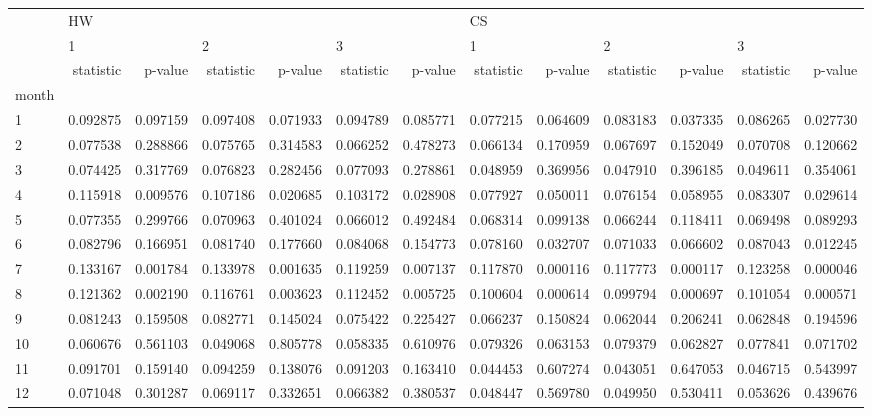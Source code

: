 \begin{tabular}{lrrrrrrrrrrrr}
\toprule
{} & \multicolumn{6}{l}{HW} & \multicolumn{6}{l}{CS} \\
{} & \multicolumn{2}{l}{1} & \multicolumn{2}{l}{2} & \multicolumn{2}{l}{3} & \multicolumn{2}{l}{1} & \multicolumn{2}{l}{2} & \multicolumn{2}{l}{3} \\
{} & statistic &   p-value & statistic &   p-value & statistic &   p-value & statistic &   p-value & statistic &   p-value & statistic &   p-value \\
month &           &           &           &           &           &           &           &           &           &           &           &           \\
\midrule
1     &  0.092875 &  0.097159 &  0.097408 &  0.071933 &  0.094789 &  0.085771 &  0.077215 &  0.064609 &  0.083183 &  0.037335 &  0.086265 &  0.027730 \\
2     &  0.077538 &  0.288866 &  0.075765 &  0.314583 &  0.066252 &  0.478273 &  0.066134 &  0.170959 &  0.067697 &  0.152049 &  0.070708 &  0.120662 \\
3     &  0.074425 &  0.317769 &  0.076823 &  0.282456 &  0.077093 &  0.278861 &  0.048959 &  0.369956 &  0.047910 &  0.396185 &  0.049611 &  0.354061 \\
4     &  0.115918 &  0.009576 &  0.107186 &  0.020685 &  0.103172 &  0.028908 &  0.077927 &  0.050011 &  0.076154 &  0.058955 &  0.083307 &  0.029614 \\
5     &  0.077355 &  0.299766 &  0.070963 &  0.401024 &  0.066012 &  0.492484 &  0.068314 &  0.099138 &  0.066244 &  0.118411 &  0.069498 &  0.089293 \\
6     &  0.082796 &  0.166951 &  0.081740 &  0.177660 &  0.084068 &  0.154773 &  0.078160 &  0.032707 &  0.071033 &  0.066602 &  0.087043 &  0.012245 \\
7     &  0.133167 &  0.001784 &  0.133978 &  0.001635 &  0.119259 &  0.007137 &  0.117870 &  0.000116 &  0.117773 &  0.000117 &  0.123258 &  0.000046 \\
8     &  0.121362 &  0.002190 &  0.116761 &  0.003623 &  0.112452 &  0.005725 &  0.100604 &  0.000614 &  0.099794 &  0.000697 &  0.101054 &  0.000571 \\
9     &  0.081243 &  0.159508 &  0.082771 &  0.145024 &  0.075422 &  0.225427 &  0.066237 &  0.150824 &  0.062044 &  0.206241 &  0.062848 &  0.194596 \\
10    &  0.060676 &  0.561103 &  0.049068 &  0.805778 &  0.058335 &  0.610976 &  0.079326 &  0.063153 &  0.079379 &  0.062827 &  0.077841 &  0.071702 \\
11    &  0.091701 &  0.159140 &  0.094259 &  0.138076 &  0.091203 &  0.163410 &  0.044453 &  0.607274 &  0.043051 &  0.647053 &  0.046715 &  0.543997 \\
12    &  0.071048 &  0.301287 &  0.069117 &  0.332651 &  0.066382 &  0.380537 &  0.048447 &  0.569780 &  0.049950 &  0.530411 &  0.053626 &  0.439676 \\
\bottomrule
\end{tabular}
